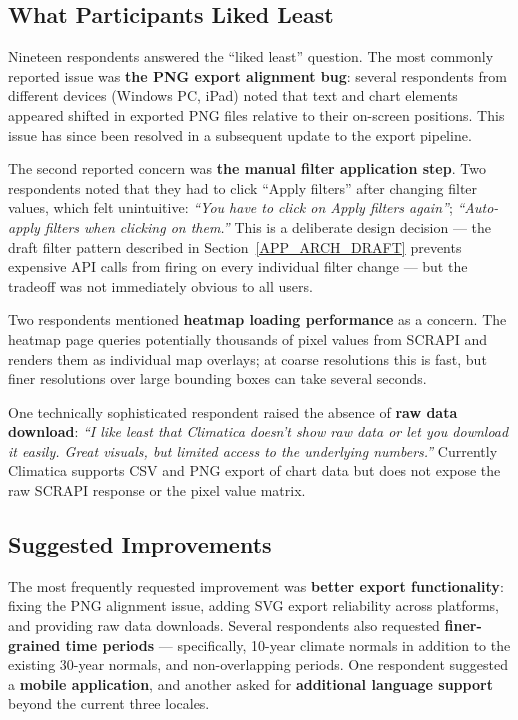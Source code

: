 \subsection{What Participants Liked Least}\label{EVAL_QUAL_DISLIKED}

Nineteen respondents answered the ``liked least'' question. The most commonly
reported issue was \textbf{the PNG export alignment bug}:
several respondents from different devices (Windows PC, iPad) noted that text
and chart elements appeared shifted in exported PNG files relative to their
on-screen positions. This issue has since been resolved in a subsequent update
to the export pipeline.

The second reported concern was \textbf{the manual filter application step}.
Two respondents noted that they had to click ``Apply filters'' after changing
filter values, which felt unintuitive: \emph{``You have to click on Apply filters
again''}; \emph{``Auto-apply filters when clicking on them.''} This is a deliberate
design decision --- the draft filter pattern described in
Section~\ref{APP_ARCH_DRAFT} prevents expensive API calls from firing on every
individual filter change --- but the tradeoff was not immediately obvious to
all users.

Two respondents mentioned \textbf{heatmap loading performance} as a concern.
The heatmap page queries potentially thousands of pixel values from SCRAPI
and renders them as individual map overlays; at coarse resolutions this is fast,
but finer resolutions over large bounding boxes can take several seconds.

One technically sophisticated respondent raised the absence of \textbf{raw
data download}: \emph{``I like least that Climatica doesn't show raw data or let you
download it easily. Great visuals, but limited access to the underlying
numbers.''} Currently Climatica supports CSV and PNG export of chart data but
does not expose the raw SCRAPI response or the pixel value matrix.

\subsection{Suggested Improvements}\label{EVAL_QUAL_SUGGEST}

The most frequently requested improvement was \textbf{better export
functionality}: fixing the PNG alignment issue, adding SVG export reliability
across platforms, and providing raw data downloads. Several respondents also
requested \textbf{finer-grained time periods} --- specifically, 10-year climate
normals in addition to the existing 30-year normals, and non-overlapping
periods. One respondent suggested a \textbf{mobile application}, and another
asked for \textbf{additional language support} beyond the current three locales.

